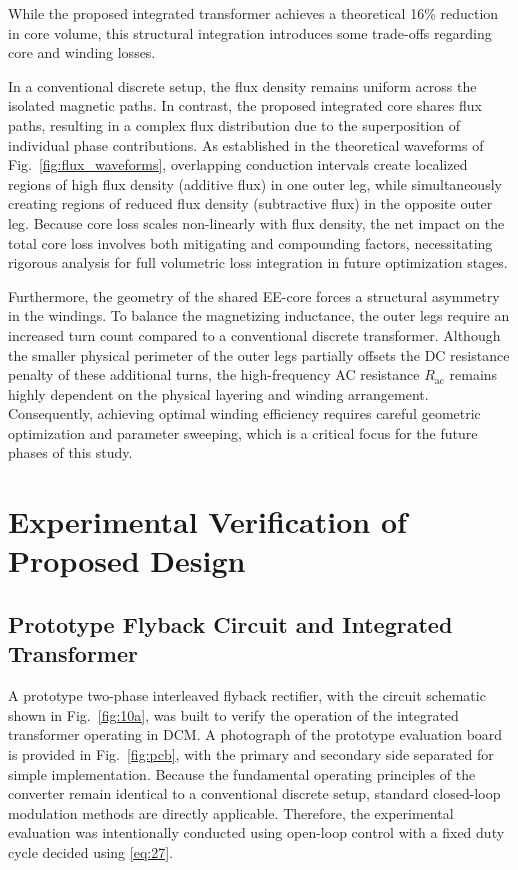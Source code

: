 \documentclass[lettersize,journal]{IEEEtran}
\begin{document}
While the proposed integrated transformer achieves a theoretical 16\% reduction in core volume, this structural integration introduces some trade-offs regarding core and winding losses.

In a conventional discrete setup, the flux density remains uniform across the isolated magnetic paths. In contrast, the proposed integrated core shares flux paths, resulting in a complex flux distribution due to the superposition of individual phase contributions. As established in the theoretical waveforms of Fig.~\ref{fig:flux_waveforms}, overlapping conduction intervals create localized regions of high flux density (additive flux) in one outer leg, while simultaneously creating regions of reduced flux density (subtractive flux) in the opposite outer leg. Because core loss scales non-linearly with flux density, the net impact on the total core loss involves both mitigating and compounding factors, necessitating rigorous analysis for full volumetric loss integration in future optimization stages.

Furthermore, the geometry of the shared EE-core forces a structural asymmetry in the windings. To balance the magnetizing inductance, the outer legs require an increased turn count compared to a conventional discrete transformer. Although the smaller physical perimeter of the outer legs partially offsets the DC resistance penalty of these additional turns, the high-frequency AC resistance $R_{\mathrm{ac}}$ remains highly dependent on the physical layering and winding arrangement. Consequently, achieving optimal winding efficiency requires careful geometric optimization and parameter sweeping, which is a critical focus for the future phases of this study.

\section{Experimental Verification of Proposed Design}

\subsection{Prototype Flyback Circuit and Integrated Transformer}

A prototype two-phase interleaved flyback rectifier, with the circuit schematic shown in Fig.~\ref{fig:10a}, was built to verify the operation of the integrated transformer operating in DCM. A photograph of the prototype evaluation board is provided in Fig.~\ref{fig:pcb}, with the primary and secondary side separated for simple implementation. Because the fundamental operating principles of the converter remain identical to a conventional discrete setup, standard closed-loop modulation methods are directly applicable. Therefore, the experimental evaluation was intentionally conducted using open-loop control with a fixed duty cycle decided using \eqref{eq:27}.
\end{document}
